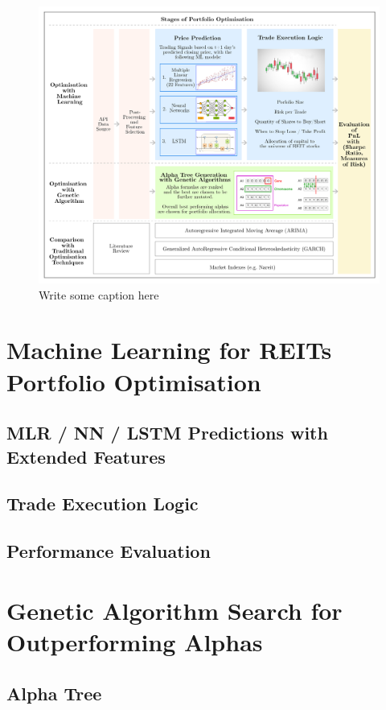 \documentclass[a4paper,12pt]{report}
\numberwithin{equation}{section}
\theoremstyle{definition}
\begin{document}
\begin{figure}[H]
\centerline{\includegraphics[width=21cm]{Overall_Methodology}}
\caption{Write some caption here}\label{visina8}
\end{figure}



\section{Machine Learning for REITs Portfolio Optimisation}
\subsection{MLR / NN / LSTM Predictions with Extended Features}
\subsection{Trade Execution Logic}
\subsection{Performance Evaluation}
\section{Genetic Algorithm Search for Outperforming Alphas}
\subsection{Alpha Tree}
\end{document}
